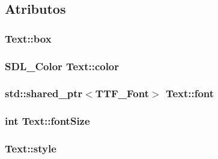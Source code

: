 \subsection{Atributos}
\hypertarget{classText_a1a2dd837322b9adcd3a2a98f68e633c9}{
\subsubsection[{box}]{ Text\+::box\hspace{0.3cm}{\ttfamily [private]}}}\label{classText_a1a2dd837322b9adcd3a2a98f68e633c9}
\hypertarget{classText_ab0f771bd18d8e968f7aaee4a4e26e385}{
\subsubsection[{color}]{\setlength{\rightskip}{0pt plus 5cm}S\+D\+L\+\_\+\+Color Text\+::color\hspace{0.3cm}{\ttfamily [private]}}}\label{classText_ab0f771bd18d8e968f7aaee4a4e26e385}
\hypertarget{classText_a7c89817e7e1d08584cf1b51106ce5ba4}{
\subsubsection[{font}]{\setlength{\rightskip}{0pt plus 5cm}std\+::shared\+\_\+ptr$<$T\+T\+F\+\_\+\+Font$>$ Text\+::font\hspace{0.3cm}{\ttfamily [private]}}}\label{classText_a7c89817e7e1d08584cf1b51106ce5ba4}
\hypertarget{classText_af1b0c4c5d94f1a5338398f37e7b9ebbe}{
\subsubsection[{font\+Size}]{\setlength{\rightskip}{0pt plus 5cm}int Text\+::font\+Size\hspace{0.3cm}{\ttfamily [private]}}}\label{classText_af1b0c4c5d94f1a5338398f37e7b9ebbe}
\hypertarget{classText_aaf6b429b30c8e7b380aa2433cf1296ea}{
\subsubsection[{style}]{ Text\+::style\hspace{0.3cm}{\ttfamily [private]}}}\label{classText_aaf6b429b30c8e7b380aa2433cf1296ea}
